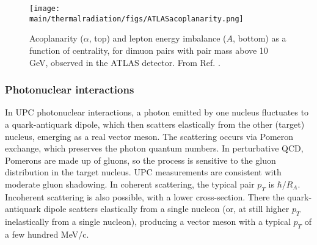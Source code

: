 \documentclass[../report.tex]{subfiles}
\providecommand{\main}{..}
\begin{document}
\begin{figure}[htb]
\centering
\texttt{[image: \\main/thermalradiation/figs/ATLASacoplanarity.png]}
\caption{Acoplanarity ($\alpha$, top) and lepton energy imbalance ($A$, bottom) as a function of centrality, for dimuon pairs with pair mass above 10 GeV, observed in the ATLAS detector.  From Ref. \cite{Aaron}.}
\label{fig:ATLASacoplanarity}
\end{figure}

\subsubsection{Photonuclear interactions}

In UPC photonuclear interactions, a photon emitted by one nucleus fluctuates to a quark-antiquark dipole, which then scatters elastically from the other (target) nucleus, emerging as a real vector meson.  The scattering occurs via Pomeron exchange, which preserves the photon quantum numbers.  In perturbative QCD, Pomerons are made up of gluons, so the process is sensitive to the gluon distribution in the target nucleus.  UPC measurements are consistent with moderate gluon shadowing.   In coherent scattering, the typical pair $p_T$ is $\hbar/R_A$.  Incoherent scattering is also possible, with a lower cross-section.  There the quark-antiquark dipole scatters elastically from a single nucleon (or, at still higher $p_T$ inelastically from a single nucleon), producing a vector meson with a typical $p_T$ of a few hundred MeV/c.
\end{document}
